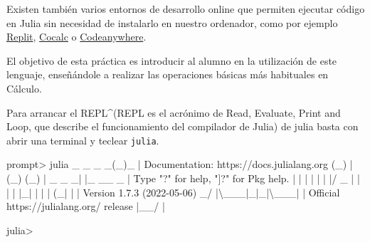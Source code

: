 \documentclass[
  a4paper,
]{scrreport}
\newenvironment{Shaded}{\begin{snugshade}}{\end{snugshade}}
\newcommand{\BuiltInTok}[1]{\textcolor[rgb]{0.00,0.23,0.31}{#1}}
\newcommand{\CharTok}[1]{\textcolor[rgb]{0.13,0.47,0.30}{#1}}
\newcommand{\ControlFlowTok}[1]{\textcolor[rgb]{0.00,0.23,0.31}{#1}}
\newcommand{\DataTypeTok}[1]{\textcolor[rgb]{0.68,0.00,0.00}{#1}}
\newcommand{\FloatTok}[1]{\textcolor[rgb]{0.68,0.00,0.00}{#1}}
\newcommand{\FunctionTok}[1]{\textcolor[rgb]{0.28,0.35,0.67}{#1}}
\newcommand{\NormalTok}[1]{\textcolor[rgb]{0.00,0.23,0.31}{#1}}
\newcommand{\OperatorTok}[1]{\textcolor[rgb]{0.37,0.37,0.37}{#1}}
\newcommand{\SpecialStringTok}[1]{\textcolor[rgb]{0.13,0.47,0.30}{#1}}
\newcommand{\StringTok}[1]{\textcolor[rgb]{0.13,0.47,0.30}{#1}}
\theoremstyle{definition}
\theoremstyle{remark}
\begin{document}
Existen también varios entornos de desarrollo online que permiten
ejecutar código en Julia sin necesidad de instalarlo en nuestro
ordenador, como por ejemplo
\href{https://replit.com/languages/julia}{Replit},
\href{https://cocalc.com/}{Cocalc} o
\href{https://codeanywhere.com/languages/julia}{Codeanywhere}.

El objetivo de esta práctica es introducir al alumno en la utilización
de este lenguaje, enseñándole a realizar las operaciones básicas más
habituales en Cálculo.

Para arrancar el REPL\^{}(REPL es el acrónimo de Read, Evaluate, Print
and Loop, que describe el funcionamiento del compilador de Julia) de
julia basta con abrir una terminal y teclear \texttt{julia}.

\begin{Shaded}
\begin{Highlighting}[]
\NormalTok{prompt}\OperatorTok{\textgreater{}}\NormalTok{ julia}
\NormalTok{               \_}
\NormalTok{   \_       \_ }\FunctionTok{\_}\NormalTok{(\_)\_     }\OperatorTok{|}\NormalTok{  Documentation}\OperatorTok{:}\NormalTok{ https}\OperatorTok{://}\NormalTok{docs.julialang.org}
\NormalTok{  (\_)     }\OperatorTok{|}\NormalTok{ (\_) (\_)    }\OperatorTok{|}
\NormalTok{   \_ \_   \_}\OperatorTok{|} \OperatorTok{|}\NormalTok{\_  \_\_ \_   }\OperatorTok{|}  \DataTypeTok{Type} \StringTok{"?"} \ControlFlowTok{for}\NormalTok{ help, }\StringTok{"]?"} \ControlFlowTok{for} \BuiltInTok{Pkg}\NormalTok{ help.}
  \OperatorTok{|} \OperatorTok{|} \OperatorTok{|} \OperatorTok{|} \OperatorTok{|} \OperatorTok{|} \OperatorTok{|/}\NormalTok{ \_}\SpecialStringTok{\textasciigrave{} |  |}
  \OperatorTok{|} \OperatorTok{|} \OperatorTok{|}\NormalTok{\_}\OperatorTok{|} \OperatorTok{|} \OperatorTok{|} \OperatorTok{|}\NormalTok{ (\_}\OperatorTok{|} \OperatorTok{|}  \OperatorTok{|}\NormalTok{  Version }\FloatTok{1.7.3}\NormalTok{ (}\FloatTok{2022}\OperatorTok{{-}}\FloatTok{05}\OperatorTok{{-}}\FloatTok{06}\NormalTok{)}
\NormalTok{ \_}\OperatorTok{/} \OperatorTok{|\textbackslash{}}\NormalTok{\_\_}\CharTok{\textquotesingle{}\_|\_|\_|\textbackslash{}\_\_\textquotesingle{}}\NormalTok{\_}\OperatorTok{|}  \OperatorTok{|}\NormalTok{  Official https}\OperatorTok{://}\NormalTok{julialang.org}\OperatorTok{/}\NormalTok{ release}
\OperatorTok{|}\NormalTok{\_\_}\OperatorTok{/}                   \OperatorTok{|}

\NormalTok{julia}\OperatorTok{\textgreater{}}
\end{Highlighting}
\end{Shaded}
\end{document}
